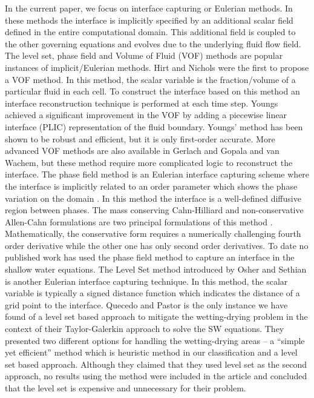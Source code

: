 \documentclass[review]{elsarticle}
\begin{document}
In the current paper, we focus  on interface capturing or Eulerian methods. In these methods the interface is implicitly  specified by an additional scalar field  defined in the entire 
computational domain. This additional field is coupled to the other governing equations and evolves due to the underlying fluid flow field.
The level set, phase field and Volume of Fluid (VOF) methods are  popular instances of implicit/Eulerian methods.
Hirt and Nichols \cite{hirt1981vfv} were the first to propose a VOF method. 
In this method, the scalar variable is the fraction/volume of a particular fluid in each cell.
To construct the interface based on this method an interface  reconstruction technique is performed at each time step. 
Youngs \cite{youngs1982tdm} achieved a significant improvement 
in the VOF by adding a piecewise linear interface   (PLIC) representation of the fluid boundary. 
Youngs' method has been shown to be robust and efficient, but it is only first-order accurate. 
More advanced VOF methods are also available in Gerlach \cite{gerlach2006cvf} and Gopala and van Wachem\cite{gopala2008vfm}, but these method require more complicated logic to 
reconstruct the interface.
The phase field method is an Eulerian interface capturing scheme where the interface is implicitly related to an order parameter which shows the phase variation on the domain \cite{Anderson1998}. 
In this method the interface is a well-defined diffusive region between phases. 
The mass conserving Cahn-Hilliard and non-conservative Allen-Cahn formulations are two principal formulations of this method \cite{CahnHilliard1958i,CahnHilliard1958ii,Yang2006}. %
 Mathematically, the conservative form requires a numerically challenging fourth order derivative while the other one has only second order derivatives. 
To date no published work has used the phase field method to capture an interface in the shallow water equations.
The Level Set method introduced by Osher and Sethian  \cite{Osher1988} is another Eulerian interface capturing technique.  In this method, the scalar variable is typically 
a signed distance function which indicates the distance of a grid point to the interface. 
Quecedo and Pastor \cite{quecedo2002rtg} is the only instance we have found of a level set based approach to mitigate the wetting-drying problem in the context of their 
 Taylor-Galerkin approach to solve the SW equations. They presented two 
different options for handling the wetting-drying areas -- a ``simple yet efficient'' method which is  heuristic method in our classification and a level set based approach. 
Although they claimed that they used level set as the second approach, no results using the method were included in the article and
 concluded  that the level set is expensive and unnecessary for their problem.
\end{document}
